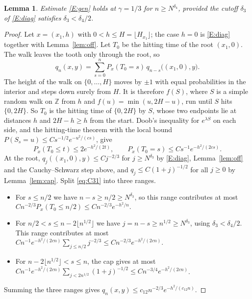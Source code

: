 \documentclass[11pt]{amsart}
\newtheorem{lemma}[theorem]{Lemma}
\theoremstyle{remark}
\numberwithin{equation}{section}
\newcommand{\Z}{\mathbb{Z}}
\begin{document}
\begin{lemma}\label{lem:gen}
Estimate \ref{E:gen} holds at $\gamma=1/3$ for $n\ge N^{\delta_4}$, provided the cutoff $\delta_3$ of \ref{E:diag} satisfies $\delta_3<\delta_4/2$.
\end{lemma}

\begin{proof}
Let $x=(x_1,h)$ with $0<h\le H=\lfloor H_{x_1}\rfloor$; the case $h=0$ is \ref{E:diag} together with Lemma~\ref{lem:off}. Let $T_0$ be the hitting time of the root $(x_1,0)$. The walk leaves the tooth only through the root, so
\begin{equation}\label{eq:C31}
q_n(x,y)=\sum_{s=0}^{n}P_x(T_0=s)\,q_{n-s}\bigl((x_1,0),y\bigr).
\end{equation}
The height of the walk on $\{0,\dots,H\}$ moves by $\pm1$ with equal probabilities in the interior and steps down surely from $H$. It is therefore $f(S)$, where $S$ is a simple random walk on $\Z$ from $h$ and $f(u)=\min(u,2H-u)$, run until $S$ hits $\{0,2H\}$. So $T_0$ is the hitting time of $\{0,2H\}$ by $S$, whose two endpoints lie at distances $h$ and $2H-h\ge h$ from the start. Doob's inequality for $e^{\lambda S}$ on each side, and the hitting-time theorem with the local bound $P(S_s=u)\le Cs^{-1/2}e^{-u^2/(cs)}$, give
\begin{equation}\label{eq:T0}
P_x(T_0\le t)\le2e^{-h^2/(2t)},\qquad P_x(T_0=s)\le Cs^{-1}e^{-h^2/(2cs)}.
\end{equation}
At the root, $q_j((x_1,0),y)\le Cj^{-2/3}$ for $j\ge N^{\delta_3}$ by \ref{E:diag}, Lemma~\ref{lem:off} and the Cauchy--Schwarz step above, and $q_j\le C(1+j)^{-1/2}$ for all $j\ge0$ by Lemma~\ref{lem:cap}. Split \eqref{eq:C31} into three ranges.
\begin{itemize}[leftmargin=*]
\item For $s\le n/2$ we have $n-s\ge n/2\ge N^{\delta_3}$, so this range contributes at most $C n^{-2/3}P_x(T_0\le n/2)\le Cn^{-2/3}e^{-h^2/n}$.
\item For $n/2<s\le n-2\lfloor n^{1/2}\rfloor$ we have $j=n-s\ge n^{1/2}\ge N^{\delta_3}$, using $\delta_3<\delta_4/2$. This range contributes at most $Cn^{-1}e^{-h^2/(2cn)}\sum_{j\le n/2}j^{-2/3}\le Cn^{-2/3}e^{-h^2/(2cn)}$.
\item For $n-2\lfloor n^{1/2}\rfloor<s\le n$, the cap gives at most $Cn^{-1}e^{-h^2/(2cn)}\sum_{j<2n^{1/2}}(1+j)^{-1/2}\le Cn^{-3/4}e^{-h^2/(2cn)}$.
\end{itemize}
Summing the three ranges gives $q_n(x,y)\le c_{12}n^{-2/3}e^{-h^2/(c_{12}n)}$.
\end{proof}
\end{document}
